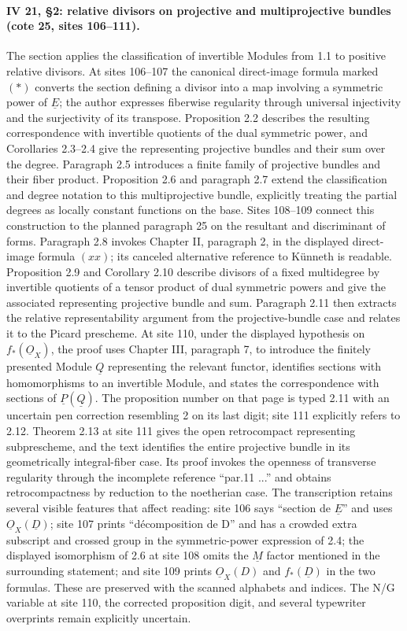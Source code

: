 \paragraph{IV 21, \S 2: relative divisors on projective and multiprojective bundles (cote 25, sites 106--111).}
The section applies the classification of invertible Modules from 1.1 to positive relative divisors. At sites 106--107 the canonical direct-image formula marked $(*)$ converts the section defining a divisor into a map involving a symmetric power of $\underline E$; the author expresses fiberwise regularity through universal injectivity and the surjectivity of its transpose. Proposition 2.2 describes the resulting correspondence with invertible quotients of the dual symmetric power, and Corollaries 2.3--2.4 give the representing projective bundles and their sum over the degree. Paragraph 2.5 introduces a finite family of projective bundles and their fiber product. Proposition 2.6 and paragraph 2.7 extend the classification and degree notation to this multiprojective bundle, explicitly treating the partial degrees as locally constant functions on the base. Sites 108--109 connect this construction to the planned paragraph 25 on the resultant and discriminant of forms. Paragraph 2.8 invokes Chapter II, paragraph 2, in the displayed direct-image formula $(xx)$; its canceled alternative reference to Künneth is readable. Proposition 2.9 and Corollary 2.10 describe divisors of a fixed multidegree by invertible quotients of a tensor product of dual symmetric powers and give the associated representing projective bundle and sum. Paragraph 2.11 then extracts the relative representability argument from the projective-bundle case and relates it to the Picard prescheme. At site 110, under the displayed hypothesis on $f_*(\underline O_X)$, the proof uses Chapter III, paragraph 7, to introduce the finitely presented Module $\underline Q$ representing the relevant functor, identifies sections with homomorphisms to an invertible Module, and states the correspondence with sections of $\underline P(\underline Q)$. The proposition number on that page is typed 2.11 with an uncertain pen correction resembling 2 on its last digit; site 111 explicitly refers to 2.12. Theorem 2.13 at site 111 gives the open retrocompact representing subprescheme, and the text identifies the entire projective bundle in its geometrically integral-fiber case. Its proof invokes the openness of transverse regularity through the incomplete reference ``par.11 ...'' and obtains retrocompactness by reduction to the noetherian case. The transcription retains several visible features that affect reading: site 106 says ``section de $\underline E$'' and uses $\underline O_X(\underline D)$; site 107 prints ``décomposition de D'' and has a crowded extra subscript and crossed group in the symmetric-power expression of 2.4; the displayed isomorphism of 2.6 at site 108 omits the $\underline M$ factor mentioned in the surrounding statement; and site 109 prints $\underline O_X(D)$ and $f_*(\underline D)$ in the two formulas. These are preserved with the scanned alphabets and indices. The N/G variable at site 110, the corrected proposition digit, and several typewriter overprints remain explicitly uncertain.
